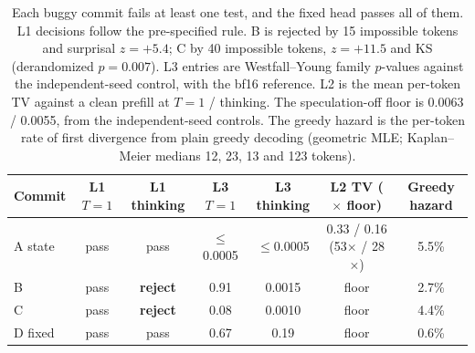 \documentclass[10pt]{article}
\theoremstyle{remark}
\begin{document}
\begin{table}[h]\centering\small
\begin{tabular}{lcccccc}
\toprule
Commit & L1 $T{=}1$ & L1 thinking & L3 $T{=}1$ & L3 thinking & L2 TV ($\times$ floor) & Greedy hazard\\
\midrule
A state & pass & pass & $\le$0.0005 & $\le$0.0005 & 0.33 / 0.16 (53$\times$ / 28$\times$) & 5.5\% \\
B & pass & \textbf{reject} & 0.91 & 0.0015 & floor & 2.7\% \\
C & pass & \textbf{reject} & 0.08 & 0.0010 & floor & 4.4\% \\
D fixed & pass & pass & 0.67 & 0.19 & floor & 0.6\% \\
\bottomrule
\end{tabular}
\caption{Each buggy commit fails at least one test, and the fixed head passes all of them.
L1 decisions follow the pre-specified rule. B is rejected by 15 impossible tokens and surprisal $z=+5.4$; C by 40 impossible tokens, $z=+11.5$ and KS (derandomized $p=0.007$).
L3 entries are Westfall--Young family $p$-values against the independent-seed control, with the bf16 reference.
L2 is the mean per-token TV against a clean prefill at $T{=}1$ / thinking. The speculation-off floor is 0.0063 / 0.0055, from the independent-seed controls.
The greedy hazard is the per-token rate of first divergence from plain greedy decoding (geometric MLE; Kaplan--Meier medians 12, 23, 13 and 123 tokens).}\label{tab:natural}\end{table}
\end{document}
